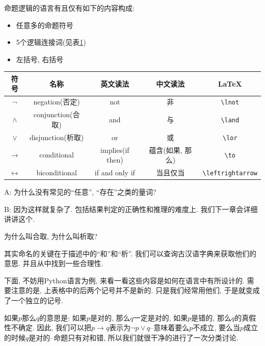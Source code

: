 \begin{definition}[命题逻辑的语言]
        命题逻辑的语言有且仅有如下的内容构成: 
        \begin{itemize}
            \item 任意多的命题符号
            \item 5个逻辑连接词(见表\ref{fig:conn})
            \item 左括号, 右括号
      	\end{itemize}
\end{definition}

\begin{table}
    \centering
    \begin{tabular}{|c||c|c|c|c|}
      \hline
      符号& 名称 & 英文读法 & 中文读法 & \LaTeX \\
      \hline \hline
      $\lnot$ & {negation}{(否定)} & not & 非 & \verb|\lnot| \\
      \hline
      $\land$ & {conjunction}{(合取)} & and & 与 & \verb|\land| \\
      \hline
      $\lor$ & {disjunction}{(析取)} & or & 或 & \verb|\lor| \\
      \hline
      $\to$ & conditional & {implies}{(if then)}
        & {蕴含}{(如果, 那么)} & \verb|\to| \\
      \hline
      $\leftrightarrow$ & biconditional & if and only if
        & 当且仅当 & \verb|\leftrightarrow| \\
      \hline
      \end{tabular}
    \label{fig:conn}
  \end{table}

\begin{dialogue}
	A: 为什么没有常见的``任意'', ``存在''之类的量词?
	
	B: 因为这样就复杂了. 包括结果判定的正确性和推理的难度上. 我们下一章会详细讲讲这个. 
\end{dialogue}

\begin{bonus}
	为什么叫合取, 为什么叫析取? 
\end{bonus}

其实命名的关键在于描述中的``和''和``析''. 我们可以查询古汉语字典来获取他们的意思. 并且从中找到一些合理性. 

下面, 不妨用Python语言为例, 来看一看这些内容是如何在语言中有所设计的. 需要注意的是, 上表格中的后两个记号并不是新的. 只是我们经常用他们, 于是就变成了一个独立的记号. 

如果$p$那么$q$的意思是: 如果$p$是对的, 那么$q$一定是对的, 如果$p$是错的, 那么$q$的真假性不确定. 因此, 我们可以把$p\rightarrow q$表示为$\lnot p \lor q$--意味着要么$p$不成立, 要么当$p$成立的时候$q$是对的--命题只有对和错, 所以我们就很干净的进行了一次分类讨论. 

